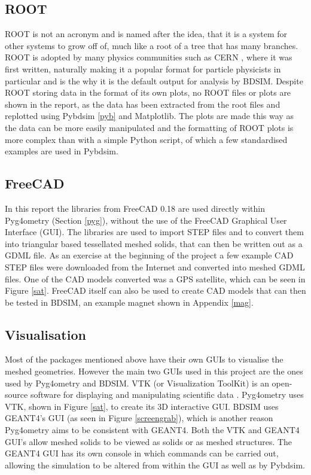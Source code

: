 \documentclass[12pt,a4paper]{article}
\begin{document}
\subsection{ROOT}\label{root}
ROOT is not an acronym and is named after the idea, that it is a system for other systems to grow off of, much like a root of a tree that has many branches. ROOT is adopted by many physics communities such as CERN \cite{cern}, where it was first written, naturally making it a popular format for particle physicists in particular and is the why it is the default output for analysis by BDSIM. Despite ROOT storing data in the format of its own plots, no ROOT files or plots are shown in the report, as the data has been extracted from the root files and replotted using Pybdsim \ref{pyb} and Matplotlib. The plots are made this way as the data can be more easily manipulated and the formatting of ROOT plots is more complex than with a simple Python script, of which a few standardised examples are used in Pybdsim.

\subsection{FreeCAD}
In this report the libraries from FreeCAD 0.18 \cite{18} are used directly within Pyg4ometry (Section \ref{pyg}), without the use of the FreeCAD Graphical User Interface (GUI). The libraries are used to import STEP files and to convert them into triangular based tessellated meshed solids, that can then be written out as a GDML file. As an exercise at the beginning of the project a few example CAD STEP files were downloaded from the Internet and converted into meshed GDML files. One of the CAD models converted was a GPS satellite, which can be seen in Figure \ref{sat}. FreeCAD itself can also be used to create CAD models that can then be tested in BDSIM, an example magnet shown in Appendix \ref{mag}.

\subsection{Visualisation}
\label{vis}
Most of the packages mentioned above have their own GUIs to visualise the meshed geometries. However the main two GUIs used in this project are the ones used by Pyg4ometry and BDSIM. VTK (or Visualization ToolKit) is an open-source software for displaying and manipulating scientific data \cite{vtk}. Pyg4ometry uses VTK, shown in Figure \ref{sat}, to create its 3D interactive GUI. BDSIM uses GEANT4's GUI (as seen in Figure \ref{screengrab}), which is another reason Pyg4ometry aims to be consistent with GEANT4. Both the VTK and GEANT4 GUI's allow meshed solids to be viewed as solids or as meshed structures. The GEANT4 GUI has its own console in which commands can be carried out, allowing the simulation to be altered from within the GUI as well as by Pybdsim.
\end{document}
